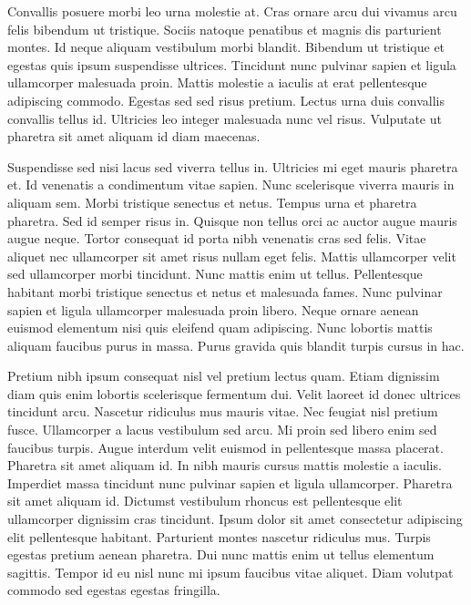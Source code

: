 \documentclass[11pt,a4paper]{article}
\begin{document}
Convallis posuere morbi leo urna molestie at. Cras ornare arcu dui vivamus arcu felis bibendum ut tristique. Sociis natoque penatibus et magnis dis parturient montes. Id neque aliquam vestibulum morbi blandit. Bibendum ut tristique et egestas quis ipsum suspendisse ultrices. Tincidunt nunc pulvinar sapien et ligula ullamcorper malesuada proin. Mattis molestie a iaculis at erat pellentesque adipiscing commodo. Egestas sed sed risus pretium. Lectus urna duis convallis convallis tellus id. Ultricies leo integer malesuada nunc vel risus. Vulputate ut pharetra sit amet aliquam id diam maecenas.

Suspendisse sed nisi lacus sed viverra tellus in. Ultricies mi eget mauris pharetra et. Id venenatis a condimentum vitae sapien. Nunc scelerisque viverra mauris in aliquam sem. Morbi tristique senectus et netus. Tempus urna et pharetra pharetra. Sed id semper risus in. Quisque non tellus orci ac auctor augue mauris augue neque. Tortor consequat id porta nibh venenatis cras sed felis. Vitae aliquet nec ullamcorper sit amet risus nullam eget felis. Mattis ullamcorper velit sed ullamcorper morbi tincidunt. Nunc mattis enim ut tellus. Pellentesque habitant morbi tristique senectus et netus et malesuada fames. Nunc pulvinar sapien et ligula ullamcorper malesuada proin libero. Neque ornare aenean euismod elementum nisi quis eleifend quam adipiscing. Nunc lobortis mattis aliquam faucibus purus in massa. Purus gravida quis blandit turpis cursus in hac.

Pretium nibh ipsum consequat nisl vel pretium lectus quam. Etiam dignissim diam quis enim lobortis scelerisque fermentum dui. Velit laoreet id donec ultrices tincidunt arcu. Nascetur ridiculus mus mauris vitae. Nec feugiat nisl pretium fusce. Ullamcorper a lacus vestibulum sed arcu. Mi proin sed libero enim sed faucibus turpis. Augue interdum velit euismod in pellentesque massa placerat. Pharetra sit amet aliquam id. In nibh mauris cursus mattis molestie a iaculis. Imperdiet massa tincidunt nunc pulvinar sapien et ligula ullamcorper. Pharetra sit amet aliquam id. Dictumst vestibulum rhoncus est pellentesque elit ullamcorper dignissim cras tincidunt. Ipsum dolor sit amet consectetur adipiscing elit pellentesque habitant. Parturient montes nascetur ridiculus mus. Turpis egestas pretium aenean pharetra. Dui nunc mattis enim ut tellus elementum sagittis. Tempor id eu nisl nunc mi ipsum faucibus vitae aliquet. Diam volutpat commodo sed egestas egestas fringilla.
\end{document}
